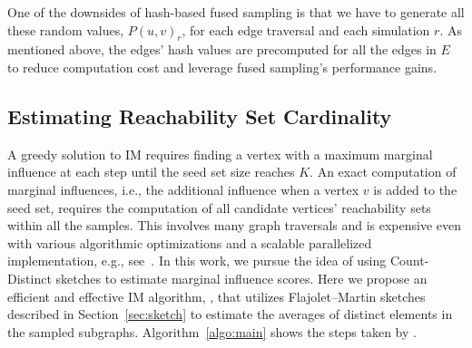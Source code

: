 \documentclass[review]{elsarticle}
\newcommand\acro{{\sc{HyperFuseR\xspace}\xspace}\xspace}
\begin{document}

One of the downsides of hash-based fused sampling is that we have to generate all these random values,  $P(u,v)_r$, for each edge traversal and each simulation $r$. As mentioned above, the edges' hash values are precomputed for all the edges in $E$ to reduce computation cost and leverage fused sampling's performance gains. %

\subsection{Estimating Reachability Set Cardinality}
A greedy solution to IM requires finding a vertex with a maximum marginal influence at each step until the seed set size reaches $K$.
An exact computation of marginal influences, i.e., the additional influence when a vertex $v$ is added to the seed set, requires the computation of all candidate vertices' reachability sets within all the samples. This involves many graph traversals and is expensive even with various algorithmic optimizations and a scalable parallelized implementation, e.g., see~\cite{infuser}. %
In this work, we pursue the idea of using Count-Distinct sketches to estimate marginal influence scores. Here we propose an efficient and effective IM algorithm, \acro, that utilizes Flajolet–Martin sketches described in Section~\ref{sec:sketch} to estimate the averages of distinct elements in the sampled subgraphs. Algorithm~\ref{algo:main} shows the steps taken by \acro.
\end{document}
